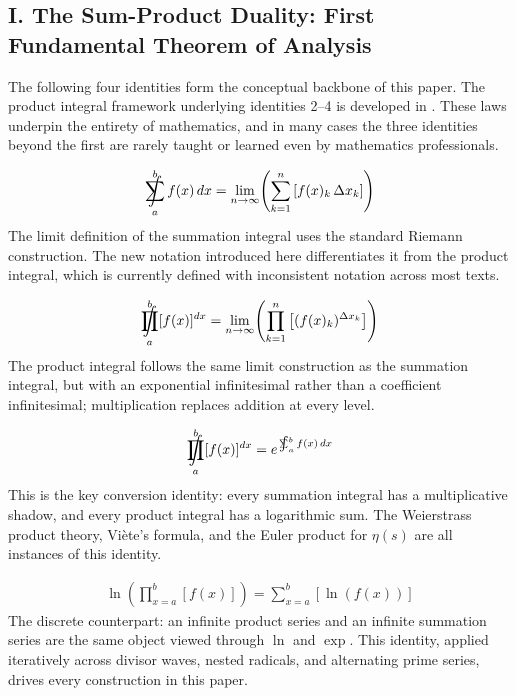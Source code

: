 \documentclass{article}
\DeclareMathOperator*{\SumInt}{%
\mathchoice%
  {\ooalign{$\displaystyle\sum$\cr\hidewidth$\displaystyle\int$\hidewidth\cr}}
  {\ooalign{\raisebox{.14\height}{\scalebox{.7}{$\textstyle\sum$}}\cr\hidewidth$\textstyle\int$\hidewidth\cr}}
  {\ooalign{\raisebox{.2\height}{\scalebox{.6}{$\scriptstyle\sum$}}\cr$\scriptstyle\int$\cr}}
  {\ooalign{\raisebox{.2\height}{\scalebox{.6}{$\scriptstyle\sum$}}\cr$\scriptstyle\int$\cr}}
}
\DeclareMathOperator*{\ProdInt}{%
\mathchoice%
  {\ooalign{$\displaystyle\prod$\cr\hidewidth$\displaystyle\int$\hidewidth\cr}}
  {\ooalign{\raisebox{.14\height}{\scalebox{.7}{$\textstyle\prod$}}\cr\hidewidth$\textstyle\int$\hidewidth\cr}}
  {\ooalign{\raisebox{.2\height}{\scalebox{.6}{$\scriptstyle\prod$}}\cr$\scriptstyle\int$\cr}}
  {\ooalign{\raisebox{.2\height}{\scalebox{.6}{$\scriptstyle\prod$}}\cr$\scriptstyle\int$\cr}}
}
\begin{document}
\newpage
\subsection{I. The Sum-Product Duality: First Fundamental Theorem of Analysis}

The following four identities form the conceptual backbone of this paper. The product integral framework underlying identities 2--4 is developed in \cite{bashirov2008multiplicative,slavik2007product}. These laws underpin the entirety of mathematics, and in many cases the three identities beyond the first are rarely taught or learned even by mathematics professionals.

\begin{align*}
\SumInt_{a}^{b} f(x)\,dx = \lim_{n \to \infty}\!\left(\sum_{k=1}^{n} \left[f(x)_{k}\,\Delta x_{k}\right]\right)
\end{align*}
The limit definition of the summation integral uses the standard Riemann construction. The new notation introduced here differentiates it from the product integral, which is currently defined with inconsistent notation across most texts.

\begin{align*}
\ProdInt_{a}^{b} [f(x)]^{dx} = \lim_{n \to \infty}\!\left(\prod_{k=1}^{n} \left[(f(x)_{k})^{\Delta x_{k}}\right]\right)
\end{align*}
The product integral follows the same limit construction as the summation integral, but with an exponential infinitesimal rather than a coefficient infinitesimal; multiplication replaces addition at every level.

\begin{align*}
\ProdInt_{a}^{b} [f(x)]^{dx} = e^{\,\SumInt_{a}^{b} f(x)\,dx}
\end{align*}
This is the key conversion identity: every summation integral has a multiplicative shadow, and every product integral has a logarithmic sum. The Weierstrass product theory, Viète's formula, and the Euler product for $\eta(s)$ are all instances of this identity.

\begin{align*}
\ln\!\left(\prod_{x=a}^{b} [f(x)]\right) = \sum_{x=a}^{b} [\ln(f(x))]
\end{align*}
The discrete counterpart: an infinite product series and an infinite summation series are the same object viewed through $\ln$ and $\exp$. This identity, applied iteratively across divisor waves, nested radicals, and alternating prime series, drives every construction in this paper.
\end{document}
